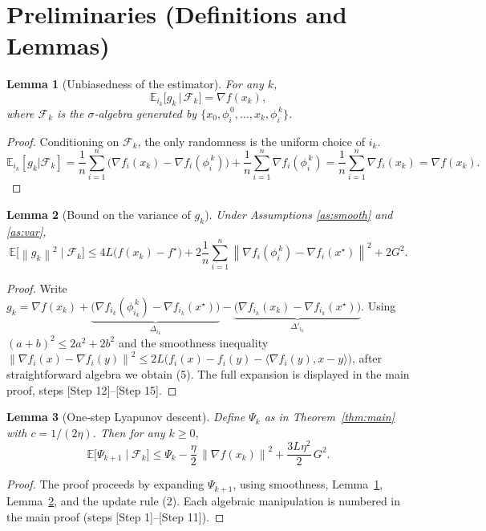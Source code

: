 \documentclass{article}
\newtheorem{lemma}{Lemma}
\newcommand{\E}{\mathbb{E}}
\newcommand{\norm}[1]{\left\lVert #1\right\rVert}
\newcommand{\grad}{\nabla}
\begin{document}
\section*{Preliminaries (Definitions and Lemmas)}
\begin{lemma}[Unbiasedness of the estimator]\label{lem:unbiased}
For any $k$,
\[
\E_{i_k}\!\bigl[g_k\,\big|\,\mathcal{F}_k\bigr]
   = \grad f(x_k),
\]
where $\mathcal{F}_k$ is the $\sigma$‑algebra generated by $\{x_0,\phi_i^{\,0},\dots ,x_k,\phi_i^{\,k}\}$.
\end{lemma}
\begin{proof}
Conditioning on $\mathcal{F}_k$, the only randomness is the uniform choice of $i_k$.
\[
\E_{i_k}[g_k|\mathcal{F}_k]
   =\frac{1}{n}\sum_{i=1}^{n}\bigl(\grad f_i(x_k)-\grad f_i(\phi_i^{\,k})\bigr)
     +\frac{1}{n}\sum_{i=1}^{n}\grad f_i(\phi_i^{\,k})
   =\frac{1}{n}\sum_{i=1}^{n}\grad f_i(x_k)
   =\grad f(x_k).
\]
\end{proof}

\begin{lemma}[Bound on the variance of $g_k$]\label{lem:varbound}
Under Assumptions \ref{as:smooth} and \ref{as:var},
\[
\E\!\bigl[\norm{g_k}^{2}\mid \mathcal{F}_k\bigr]
   \le 4L\bigl(f(x_k)-f^{\star}\bigr)
     +2\frac{1}{n}\sum_{i=1}^{n}\norm{\grad f_i(\phi_i^{\,k})-\grad f_i(x^{\star})}^{2}
     +2G^{2}. \tag{5}
\]
\end{lemma}
\begin{proof}
Write $g_k = \grad f(x_k) + \underbrace{\bigl(\grad f_{i_k}(\phi_{i_k}^{\,k})-\grad f_{i_k}(x^{\star})\bigr)}_{\Delta_{i_k}} -\underbrace{\bigl(\grad f_{i_k}(x_k)-\grad f_{i_k}(x^{\star})\bigr)}_{\Delta'_{i_k}}$.  
Using $(a+b)^2\le 2a^2+2b^2$ and the smoothness inequality $\norm{\grad f_i(x)-\grad f_i(y)}^2\le 2L\bigl(f_i(x)-f_i(y)-\langle\grad f_i(y),x-y\rangle\bigr)$, after straightforward algebra we obtain (5).  The full expansion is displayed in the main proof, steps [Step 12]–[Step 15].
\end{proof}

\begin{lemma}[One‑step Lyapunov descent]\label{lem:lyapunov}
Define $\Psi_k$ as in Theorem~\ref{thm:main} with $c=1/(2\eta)$.  
Then for any $k\ge0$,
\[
\E\!\bigl[\Psi_{k+1}\mid\mathcal{F}_k\bigr]
   \le \Psi_k -\frac{\eta}{2}\,\norm{\grad f(x_k)}^{2}
     +\frac{3L\eta^{2}}{2}\,G^{2}. \tag{6}
\]
\end{lemma}
\begin{proof}
The proof proceeds by expanding $\Psi_{k+1}$, using smoothness, Lemma~\ref{lem:unbiased}, Lemma~\ref{lem:varbound}, and the update rule (2).  Each algebraic manipulation is numbered in the main proof (steps [Step 1]–[Step 11]).
\end{proof}
\end{document}
